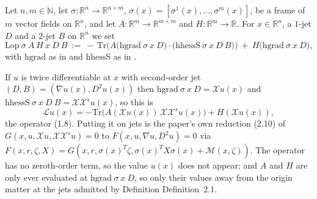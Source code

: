 \begin{definition}
Let $n,m\in\mathbb N$, let
$\sigma:\mathbb R^n\to\mathbb R^{n\times m}$, $\sigma(x)=[\sigma^1(x),\ldots,\sigma^m(x)]$,
be a frame of $m$ vector fields on $\mathbb R^n$, and let
$A:\mathbb R^m\to\mathbb R^{m\times m}$ and $H:\mathbb R^m\to\mathbb R$. For
$x\in\mathbb R^n$, a $1$-jet $D$ and a $2$-jet $B$ on $\mathbb R^n$ we set
\[
 \mathrm{Lop}\ \sigma\ A\ H\ x\ D\ B
 \ :=\ -\,\mathrm{Tr}\Big(A\big(\mathrm{hgrad}\ \sigma\ x\ D\big)\cdot
       \big(\mathrm{hhessS}\ \sigma\ x\ D\ B\big)\Big)
   \ +\ H\big(\mathrm{hgrad}\ \sigma\ x\ D\big),
\]
with $\mathrm{hgrad}$ as in  and $\mathrm{hhessS}$ as in .

If $u$ is twice differentiable at $x$ with second-order jet
$(D,B)=(\nabla u(x),D^2u(x))$ then $\mathrm{hgrad}\ \sigma\ x\ D=\mathcal Xu(x)$ and
$\mathrm{hhessS}\ \sigma\ x\ D\ B=\mathcal X\mathcal X^{s}u(x)$, so this is
\[
 \mathcal Lu(x)=-\mathrm{Tr}\big(A(\mathcal Xu(x))\,\mathcal X\mathcal X^{s}u(x)\big)
   +H(\mathcal Xu(x)),
\]
the operator (1.8). Putting it on jets is the paper's own reduction (2.10) of
$G(x,u,\mathcal Xu,\mathcal X\mathcal X^{s}u)=0$ to $F(x,u,\nabla u,D^2u)=0$ via
$F(x,r,\zeta,X)=G(x,r,\sigma(x)^T\zeta,\sigma(x)^TX\sigma(x)+\mathcal M(x,\zeta))$. The
operator has no zeroth-order term, so the value $u(x)$ does not appear; and $A$ and $H$
are only ever evaluated at $\mathrm{hgrad}\ \sigma\ x\ D$, so only their values away from
the origin matter at the jets admitted by Definition Definition~2.1.
\end{definition}
